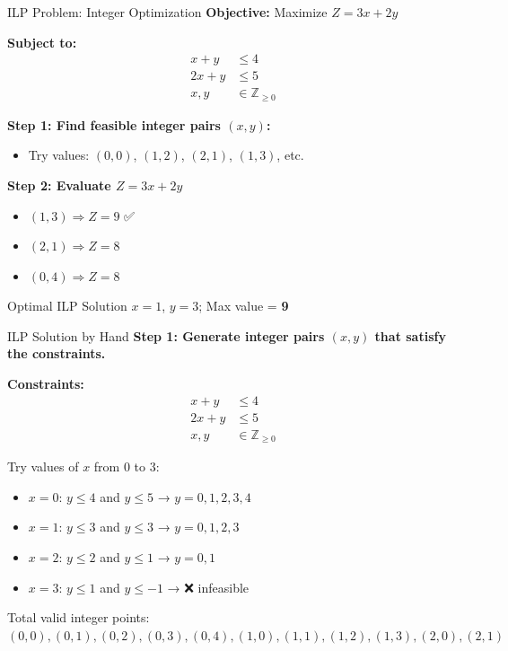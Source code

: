 \documentclass{purdue-slide}
\begin{document}
\begin{frame}{ILP Problem: Integer Optimization}
	\textbf{Objective:} Maximize \(Z = 3x + 2y\)

	\textbf{Subject to:}
	\[
		\begin{aligned}
			x + y &\leq 4 \\
			2x + y &\leq 5 \\
			x, y &\in \mathbb{Z}_{\geq 0}
		\end{aligned}
	\]

	\textbf{Step 1: Find feasible integer pairs \((x,y)\):}
	\begin{itemize}
		\item Try values: \((0,0)\), \((1,2)\), \((2,1)\), \((1,3)\), etc.
	\end{itemize}

	\textbf{Step 2: Evaluate \(Z = 3x + 2y\)}

	\begin{itemize}
		\item \((1,3) \Rightarrow Z = 9\) ✅
		\item \((2,1) \Rightarrow Z = 8\)
		\item \((0,4) \Rightarrow Z = 8\)
	\end{itemize}

	\begin{alertblock}{Optimal ILP Solution}
		\(x = 1\), \(y = 3\); Max value = \textbf{9}
	\end{alertblock}
\end{frame}

\begin{frame}{ILP Solution by Hand}
	\textbf{Step 1: Generate integer pairs \((x, y)\) that satisfy the constraints.}

	\textbf{Constraints:}
	\[
		\begin{aligned}
			x + y &\leq 4 \\
			2x + y &\leq 5 \\
			x, y &\in \mathbb{Z}_{\geq 0}
		\end{aligned}
	\]

	Try values of \(x\) from 0 to 3:

	\begin{itemize}
		\item \(x = 0\): \(y \leq 4\) and \(y \leq 5\) → \(y = 0,1,2,3,4\)
		\item \(x = 1\): \(y \leq 3\) and \(y \leq 3\) → \(y = 0,1,2,3\)
		\item \(x = 2\): \(y \leq 2\) and \(y \leq 1\) → \(y = 0,1\)
		\item \(x = 3\): \(y \leq 1\) and \(y \leq -1\) → ❌ infeasible
	\end{itemize}

	Total valid integer points:
	\((0,0), (0,1), (0,2), (0,3), (0,4), (1,0), (1,1), (1,2), (1,3), (2,0), (2,1)\)
\end{frame}
\end{document}
